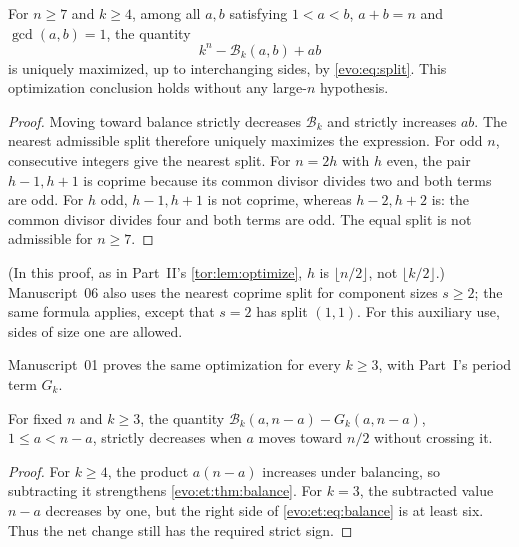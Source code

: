 \documentclass[11pt,a4paper]{article}
\numberwithin{equation}{section}
\theoremstyle{definition}
\theoremstyle{remark}
\newcommand{\Bip}{\mathcal B}
\begin{document}
\begin{corollary}\label{evo:cor:split}
For $n\ge7$ and $k\ge4$, among all $a,b$ satisfying $1<a<b$, $a+b=n$ and
$\gcd(a,b)=1$, the quantity
\[
 k^n-\Bip_k(a,b)+ab
\]
is uniquely maximized, up to interchanging sides, by \eqref{evo:eq:split}.
This optimization conclusion holds without any large-$n$ hypothesis.
\end{corollary}
\begin{proof}
Moving toward balance strictly decreases $\Bip_k$ and strictly increases
$ab$. The nearest admissible split therefore uniquely maximizes the
expression. For odd $n$, consecutive integers give the nearest split. For
$n=2h$ with $h$ even, the pair $h-1,h+1$ is coprime because its common
divisor divides two and both terms are odd. For $h$ odd, $h-1,h+1$ is not
coprime, whereas $h-2,h+2$ is: the common divisor divides four and both terms
are odd. The equal split is not admissible for $n\ge7$.
\end{proof}

(In this proof, as in Part~II's \cref{tor:lem:optimize}, $h$ is $\lfloor
n/2\rfloor$, not $\lfloor k/2\rfloor$.) Manuscript~06 also uses the nearest
coprime split for component sizes $s\ge2$; the same formula applies, except
that $s=2$ has split $(1,1)$. For this auxiliary use, sides of size one are
allowed.

Manuscript~01 proves the same optimization for every $k\ge3$, with Part~I's
period term $G_k$.

\begin{corollary}\label{evo:et:cor:balanceT}
For fixed $n$ and $k\ge3$, the quantity $\Bip_k(a,n-a)-G_k(a,n-a)$,
$1\le a<n-a$, strictly decreases when $a$ moves toward $n/2$ without crossing
it.
\end{corollary}
\begin{proof}
For $k\ge4$, the product $a(n-a)$ increases under balancing, so subtracting
it strengthens \cref{evo:et:thm:balance}. For $k=3$, the subtracted value
$n-a$ decreases by one, but the right side of \eqref{evo:et:eq:balance} is at
least six. Thus the net change still has the required strict sign.
\end{proof}
\end{document}
